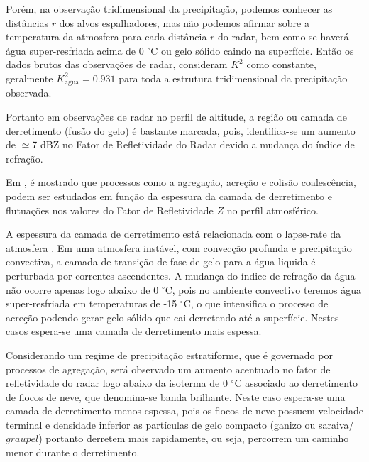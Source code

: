 Porém, na observação tridimensional da precipitação, podemos conhecer as distâncias $r$ dos alvos espalhadores, mas não podemos afirmar sobre a temperatura da atmosfera para cada distância $r$ do radar, bem como se haverá água super-resfriada acima de 0 $^{\circ}$C ou gelo sólido caindo na superfície. Então os dados brutos das observações de radar, consideram $K^2$ como constante, geralmente $K_{\mathrm{agua}}^2 = 0.931$  para toda a estrutura tridimensional da precipitação observada.

Portanto em observações de radar no perfil de altitude, a região ou camada de derretimento (fusão do gelo) é bastante marcada, pois, identifica-se um aumento de $\simeq$7 dBZ no Fator de Refletividade do Radar devido a mudança do índice de refração.

Em , é mostrado que processos como a agregação, acreção e colisão coalescência, podem ser estudados em função da espessura da camada de derretimento e flutuações nos valores do Fator de Refletividade $Z$ no perfil atmosférico. 

A espessura da camada de derretimento está relacionada com o lapse-rate da atmosfera \cite[p.~462]{mason1971_2ed}. Em uma atmosfera instável, com convecção profunda e precipitação convectiva, a camada de transição de fase de gelo para a água liquida é perturbada por correntes ascendentes. A mudança do índice de refração da água não ocorre apenas logo abaixo de 0 $^{\circ}$C, pois no ambiente convectivo teremos água super-resfriada em temperaturas de -15 $^{\circ}$C, o que intensifica o processo de acreção podendo gerar gelo sólido que cai derretendo até a superfície. Nestes casos espera-se uma camada de derretimento mais espessa.

Considerando um regime de precipitação estratiforme, que é governado por processos de agregação, será observado um aumento acentuado no fator de refletividade do radar logo abaixo da isoterma de 0 $^{\circ}$C associado ao derretimento de flocos de neve, que denomina-se banda brilhante. Neste caso espera-se uma camada de derretimento menos espessa, pois os flocos de neve possuem velocidade terminal e densidade inferior as partículas de gelo compacto (ganizo ou saraiva/$graupel$) portanto derretem mais rapidamente, ou seja, percorrem um caminho menor durante o derretimento. 



